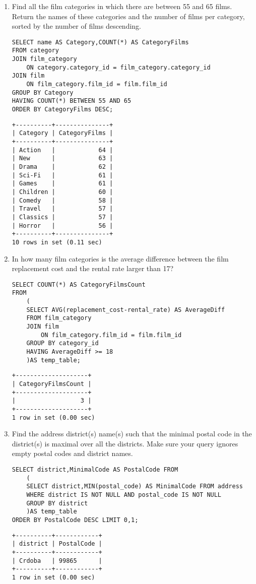 \documentclass[]{article}
\begin{document}
\begin{enumerate}
\item Find all the film categories in which there are between 55 and 65 films. Return the names of these categories and the number of films per category, sorted by the number of films descending.
\begin{verbatim}
SELECT name AS Category,COUNT(*) AS CategoryFilms
FROM category
JOIN film_category
	ON category.category_id = film_category.category_id
JOIN film
	ON film_category.film_id = film.film_id
GROUP BY Category
HAVING COUNT(*) BETWEEN 55 AND 65
ORDER BY CategoryFilms DESC;
\end{verbatim}
\begin{verbatim}
+----------+---------------+
| Category | CategoryFilms |
+----------+---------------+
| Action   |            64 |
| New      |            63 |
| Drama    |            62 |
| Sci-Fi   |            61 |
| Games    |            61 |
| Children |            60 |
| Comedy   |            58 |
| Travel   |            57 |
| Classics |            57 |
| Horror   |            56 |
+----------+---------------+
10 rows in set (0.11 sec)
\end{verbatim}

\item In how many film categories is the average difference between the film replacement cost and the rental rate larger
than 17?
\begin{verbatim}
SELECT COUNT(*) AS CategoryFilmsCount
FROM
	( 
	SELECT AVG(replacement_cost-rental_rate) AS AverageDiff
	FROM film_category
	JOIN film
		ON film_category.film_id = film.film_id
	GROUP BY category_id
	HAVING AverageDiff >= 18
	)AS temp_table;
\end{verbatim}
\begin{verbatim}
+--------------------+
| CategoryFilmsCount |
+--------------------+
|                  3 |
+--------------------+
1 row in set (0.00 sec)
\end{verbatim}

\item Find the address district(s) name(s) such that the minimal postal code in the district(s) is maximal over all the
districts. Make sure your query ignores empty postal codes and district names.
\begin{verbatim}
SELECT district,MinimalCode AS PostalCode FROM
	( 
	SELECT district,MIN(postal_code) AS MinimalCode FROM address
	WHERE district IS NOT NULL AND postal_code IS NOT NULL
	GROUP BY district
	)AS temp_table
ORDER BY PostalCode DESC LIMIT 0,1;
\end{verbatim}
\begin{verbatim}
+----------+------------+
| district | PostalCode |
+----------+------------+
| Crdoba   | 99865      |
+----------+------------+
1 row in set (0.00 sec)
\end{verbatim}


\end{enumerate}
\end{document}
